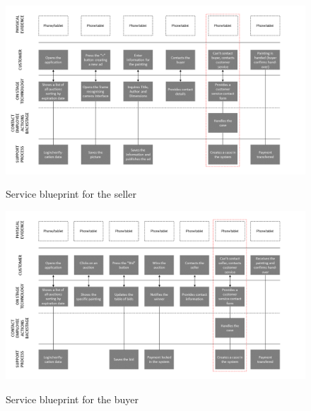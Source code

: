 \begin{figure}[H]
    \centering
\caption{Service blueprint for the seller}
\includegraphics[angle=270,origin=c,width=12cm]{Appendix/BlueprintSeller.PNG}
\label{ServiceBlueprintSeller}
\end{figure}

\begin{figure}[H]
    \centering
\caption{Service blueprint for the buyer}
\includegraphics[angle=270,origin=c,width=13cm]{Appendix/BlueprintBuyer.PNG}
\label{ServiceBlueprintBuyer}
\end{figure}